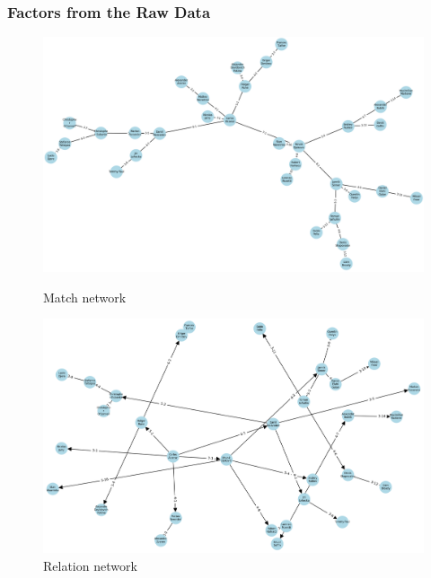 \documentclass{mcmthesis}
\begin{document}
\subsubsection{Factors from the Raw Data}
\begin{figure}[ht]
    \centering
    \begin{minipage}{0.32\textwidth}  %
        \centering
        \includegraphics[width=\textwidth]{figures/network1.png}
        \caption{Match network}
        \label{fig:Match network}
    \end{minipage}\hfill
    \begin{minipage}{0.32\textwidth}
        \centering
        \includegraphics[width=\textwidth]{figures/network2.png}
        \caption{Relation network}
        \label{fig:Relation network}
    \end{minipage}\hfill
    \begin{minipage}{0.32\textwidth}
        \centering

\end{minipage}
\end{figure}
\end{document}
